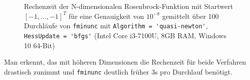 \documentclass[a4paper, 12pt]{report}
\begin{document}
\begin{figure}[H]
  \centering
\caption{Rechenzeit der N-dimensionalen Rosenbrock-Funktion mit Startwert $[-1, \ldots, -1]^T$ für
  eine Genauigkeit von $10^{-8}$ gemittelt über 100 Durchläufe von \lstinline[basicstyle=\ttfamily\color{black}]|fminunc| mit
  \lstinline[basicstyle=\ttfamily\color{black}]|Algorithm = 'quasi-newton'|,
  \lstinline[basicstyle=\ttfamily\color{black}]|HessUpdate = 'bfgs'| (Intel Core i3-7100U, 8GB RAM, Windows 10 64-Bit)}
\end{figure}

Man erkennt, das mit höheren Dimensionen die Rechenzeit für beide Verfahren drastisch zunimmt und
\lstinline[basicstyle=\ttfamily\color{black}]|fminunc| deutlich früher 3s pro Durchlauf benötigt.\par
\end{document}
